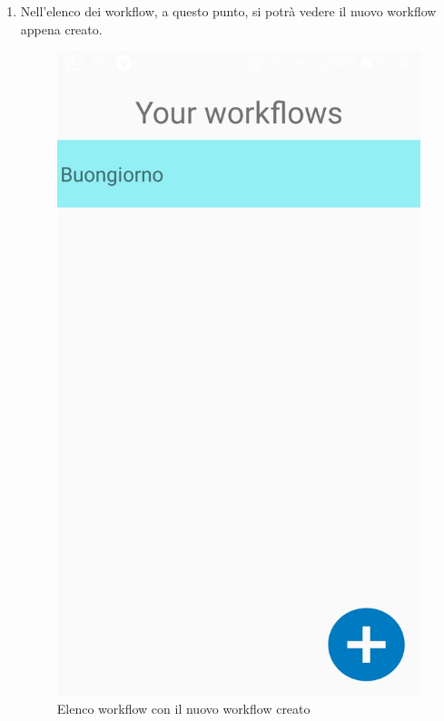 \begin{enumerate}
\newpage
\item Nell'elenco dei workflow, a questo punto, si potrà vedere il nuovo workflow appena creato.

\begin{figure}[!ht]
	\centering
	\includegraphics[scale=0.2]{images/HomeWorkflow.jpg}
	\caption{Elenco workflow con il nuovo workflow creato}
\end{figure}

\end{enumerate}

